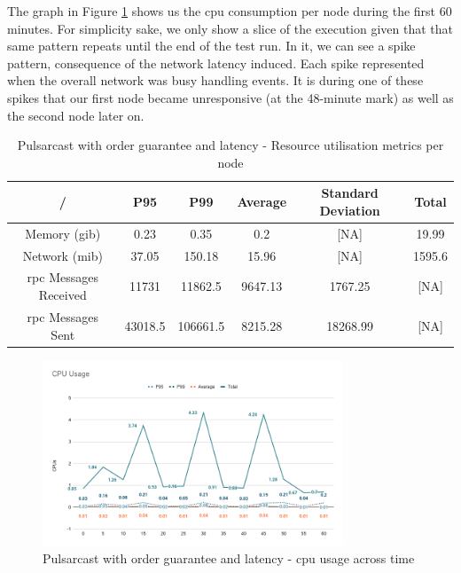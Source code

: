 The graph in Figure \ref{fig:graph-pulsarcast-order-latency-cpu} shows us the
\acrshort{cpu} consumption per node during the first 60 minutes. For simplicity
sake, we only show a slice of the execution given that that same pattern
repeats until the end of the test run. In it, we can see a spike pattern,
consequence of the network latency induced. Each spike represented when the
overall network was busy handling events. It is during one of these spikes that
our first node became unresponsive (at the 48-minute mark) as well as the
second node later on.

\begin{table}[!htb]
\caption{Pulsarcast with order guarantee and latency - Resource utilisation metrics per node}
\label{table:pulsarcast-order-latency}
  \begin{center}
   \begin{tabular}{|c| c c c c c|} 
   \hline
   / & P95 & P99 & Average & Standard Deviation & Total \\ [0.5ex] 
   \hline\hline
   Memory (\acrshort{gib}) & 0.23 & 0.35 & 0.2 & [NA] & 19.99 \\
   \hline
   Network (\acrshort{mib}) & 37.05 & 150.18 & 15.96 & [NA] & 1595.6 \\
   \hline
   \acrshort{rpc} Messages Received & 11731 & 11862.5 & 9647.13 & 1767.25 & [NA] \\
   \hline
   \acrshort{rpc} Messages Sent & 43018.5 & 106661.5 & 8215.28 & 18268.99 & [NA] \\ [1ex] 
   \hline
  \end{tabular}
  \end{center}
\end{table}

\begin{figure}[!htb]
  \centering
  \includegraphics[width=0.8\textwidth]{../images/graph-pulsarcast-order-latency-cpu.png}
  \caption{Pulsarcast with order guarantee and latency - \acrshort{cpu} usage across time}
  \label{fig:graph-pulsarcast-order-latency-cpu}
\end{figure}

